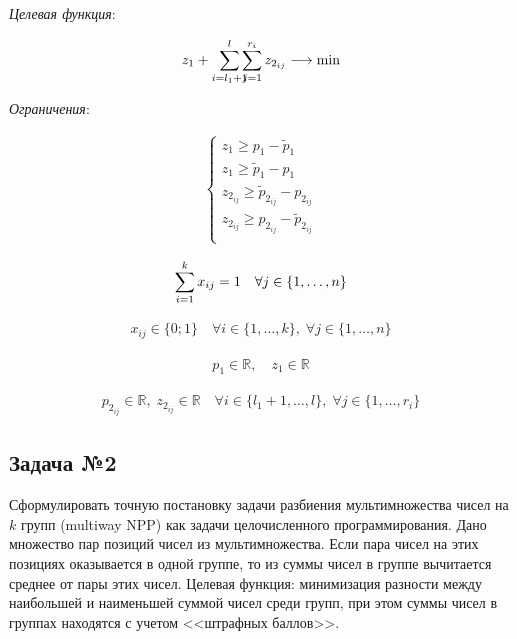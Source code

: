 \documentclass[14pt,fleqn]{extarticle}
\begin{document}
	\textit{Целевая функция}:
	\begin{ceqn}
		\begin{align*}
			z_1 + \smashoperator[r]{\sum_{i=l_1+1}^{l}} \smashoperator[r]{\sum_{j=1}^{r_i}} z_{2_{ij}} \longrightarrow \min
		\end{align*}
	\end{ceqn}

	\textit{Ограничения}:
	\begin{ceqn}
		\begin{align*}
			\begin{cases}
				z_1 \geq p_1 - \widetilde{p}_{1}\\
				z_1 \geq \widetilde{p}_{1} - p_1\\
				z_{2_{ij}} \geq \widetilde{p}_{2_{ij}} - p_{2_{ij}}\\
				z_{2_{ij}} \geq p_{2_{ij}} - \widetilde{p}_{2_{ij}}\\
			\end{cases}
		\end{align*}
	\end{ceqn}

	\begin{ceqn}
		\begin{align*}
			\smashoperator[r]{\sum_{i=1}^{k}} x_{ij} = 1 \quad \forall j \in \{1, \dots, n\}
		\end{align*}
	\end{ceqn}

	\begin{ceqn}
		\begin{align*}
			x_{ij} \in \{0;1\} \quad \forall i \in \{1, \dots, k\}, \; \forall j \in \{1, \dots, n\}
		\end{align*}
	\end{ceqn}

	\begin{ceqn}
		\begin{align*}
			p_1 \in \mathbb{R}, \quad z_1 \in \mathbb{R}
		\end{align*}
	\end{ceqn}

	\begin{ceqn}
		\begin{align*}
			p_{2_{ij}} \in \mathbb{R}, \; z_{2_{ij}} \in \mathbb{R} \quad \forall i \in \{l_1+1, \dots, l\}, \; \forall j \in \{1, \dots, r_i\}
		\end{align*}
	\end{ceqn}


	\newpage
    \subsection*{Задача №2}
    Сформулировать точную постановку задачи разбиения мультимножества чисел на $k$ групп (multiway NPP) как задачи целочисленного программирования. Дано множество пар позиций чисел из мультимножества. Если пара чисел на этих позициях оказывается в одной группе, то из суммы чисел в группе вычитается среднее от пары этих чисел. Целевая функция: минимизация разности между наибольшей и наименьшей суммой чисел среди групп, при этом суммы чисел в группах находятся с учетом <<штрафных баллов>>.\\
    
\end{document}

